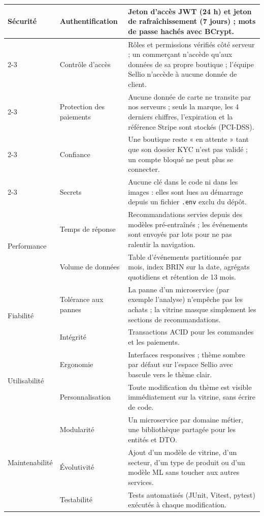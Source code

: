 \begin{longtable}{|p{3.2cm}|p{4cm}|p{8cm}|}
\multirow{5}{*}{Sécurité} & Authentification & Jeton d'accès JWT (24 h) et jeton de rafraîchissement (7 jours) ; mots de passe hachés avec BCrypt. \\
\cline{2-3}
 & Contrôle d'accès & Rôles et permissions vérifiés côté serveur ; un commerçant n'accède qu'aux données de sa propre boutique ; l'équipe Sellio n'accède à aucune donnée de client. \\
\cline{2-3}
 & Protection des paiements & Aucune donnée de carte ne transite par nos serveurs ; seuls la marque, les 4 derniers chiffres, l'expiration et la référence Stripe sont stockés (PCI-DSS). \\
\cline{2-3}
 & Confiance & Une boutique reste « en attente » tant que son dossier KYC n'est pas validé ; un compte bloqué ne peut plus se connecter. \\
\cline{2-3}
 & Secrets & Aucune clé dans le code ni dans les images : elles sont lues au démarrage depuis un fichier \texttt{.env} exclu du dépôt. \\
\hline
\multirow{2}{*}{Performance} & Temps de réponse & Recommandations servies depuis des modèles pré-entraînés ; les événements sont envoyés par lots pour ne pas ralentir la navigation. \\
\cline{2-3}
 & Volume de données & Table d'événements partitionnée par mois, index BRIN sur la date, agrégats quotidiens et rétention de 13 mois. \\
\hline
\multirow{2}{*}{Fiabilité} & Tolérance aux pannes & La panne d'un microservice (par exemple l'analyse) n'empêche pas les achats ; la vitrine masque simplement les sections de recommandations. \\
\cline{2-3}
 & Intégrité & Transactions ACID pour les commandes et les paiements. \\
\hline
\multirow{2}{*}{Utilisabilité} & Ergonomie & Interfaces responsives ; thème sombre par défaut sur l'espace Sellio avec bascule vers le thème clair. \\
\cline{2-3}
 & Personnalisation & Toute modification du thème est visible immédiatement sur la vitrine, sans écrire de code. \\
\hline
\multirow{3}{*}{Maintenabilité} & Modularité & Un microservice par domaine métier, une bibliothèque partagée pour les entités et DTO. \\
\cline{2-3}
 & Évolutivité & Ajout d'un modèle de vitrine, d'un secteur, d'un type de produit ou d'un modèle ML sans toucher aux autres services. \\
\cline{2-3}
 & Testabilité & Tests automatisés (JUnit, Vitest, pytest) exécutés à chaque modification. \\

\end{longtable}
